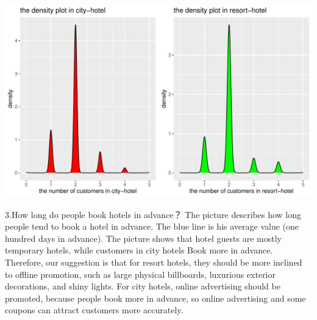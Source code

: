 \documentclass[11pt,a4paper,]{article}
\newenvironment{Shaded}{\begin{snugshade}}{\end{snugshade}}
\newcommand{\DataTypeTok}[1]{\textcolor[rgb]{0.13,0.29,0.53}{#1}}
\newcommand{\FloatTok}[1]{\textcolor[rgb]{0.00,0.00,0.81}{#1}}
\newcommand{\KeywordTok}[1]{\textcolor[rgb]{0.13,0.29,0.53}{\textbf{#1}}}
\newcommand{\NormalTok}[1]{#1}
\newcommand{\OperatorTok}[1]{\textcolor[rgb]{0.81,0.36,0.00}{\textbf{#1}}}
\newcommand{\StringTok}[1]{\textcolor[rgb]{0.31,0.60,0.02}{#1}}
\begin{document}
\includegraphics{tidy_files/figure-latex/the density plot by number of customers-1.pdf}

3.How long do people book hotels in advance？
The picture describes how long people tend to book a hotel in advance. The blue line is his average value (one hundred days in advance). The picture shows that hotel guests are mostly temporary hotels, while customers in city hotels Book more in advance.
Therefore, our suggestion is that for resort hotels, they should be more inclined to offline promotion, such as large physical billboards, luxurious exterior decorations, and shiny lights.
For city hotels, online advertising should be promoted, because people book more in advance, so online advertising and some coupons can attract customers more accurately.

\begin{Shaded}
\end{Shaded}
\end{document}
